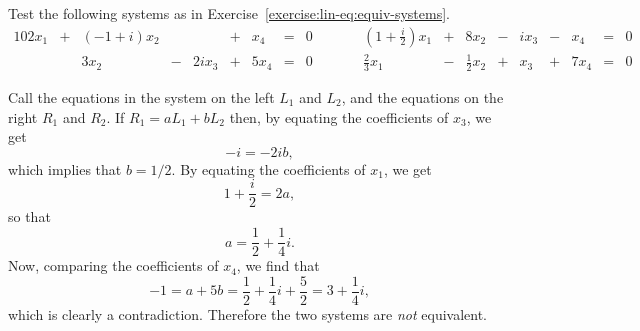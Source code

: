  Test the following systems as in
Exercise~\ref{exercise:lin-eq:equiv-systems}.
\begin{alignat*}{10}
  2x_1 &{}+{}& (-1 + i)x_2 &     &       &{}+{}&  x_4 &{}={}& 0
  &\qquad& \left(1+\frac{i}2\right)x_1 &{}+{}&       8x_2
  &{}-{}& ix_3 &{}-{}&  x_4 &{}={}& 0 \\
       &     &        3x_2 &{}-{}& 2ix_3 &{}+{}& 5x_4 &{}={}& 0
  &      &                  \tfrac23x_1 &{}-{}& \tfrac12x_2
  &{}+{}&  x_3 &{}+{}& 7x_4 &{}={}& 0
\end{alignat*}
\begin{solution}
  Call the equations in the system on the left $L_1$ and $L_2$, and
  the equations on the right $R_1$ and $R_2$. If $R_1 = aL_1 + bL_2$
  then, by equating the coefficients of $x_3$, we get
  \begin{equation*}
    -i = -2ib,
  \end{equation*}
  which implies that $b = 1/2$. By equating the coefficients of $x_1$,
  we get
  \begin{equation*}
    1 + \frac{i}2 = 2a,
  \end{equation*}
  so that
  \begin{equation*}
    a = \frac12 + \frac14i.
  \end{equation*}
  Now, comparing the coefficients of $x_4$, we find that
  \begin{equation*}
    -1 = a + 5b = \frac12 + \frac14i + \frac52
    = 3 + \frac14i,
  \end{equation*}
  which is clearly a contradiction. Therefore the two systems are {\em
    not} equivalent.
\end{solution}


